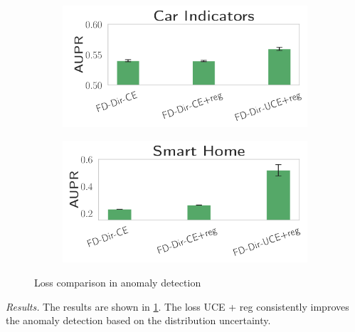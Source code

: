 \begin{figure}[H]
\centering
    \begin{subfigure}{0.3\textwidth}
        \centering
        \includegraphics[width=\linewidth]{sections/010_neurips2019/paper/images/uncertainty-apr-bmw-indicator-ok3.png}
    \end{subfigure}%
    \begin{subfigure}{0.3\textwidth}
        \centering
        \includegraphics[width=\linewidth]{sections/010_neurips2019/paper/images/uncertainty-apr-kast-home-ok3.png}
    \end{subfigure}%
    \caption{Loss comparison in anomaly detection}
    \label{fig:loss_comparison}
    \vspace{-0.5cm}
\end{figure}

\textit{Results.} The results are shown in \cref{fig:loss_comparison}. The loss UCE + reg consistently improves the anomaly detection based on the distribution uncertainty.

